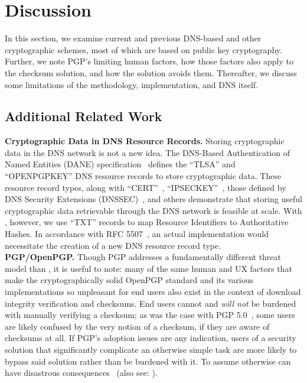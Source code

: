 \section{Discussion} \label{sec:discussion}

In this section, we examine current and previous DNS-based and other
cryptographic schemes, most of which are based on public key cryptography.
Further, we note PGP's limiting human factors, how those factors also apply to
the checksum solution, and how the \SYSTEM{} solution avoids them. Thereafter,
we discuss some limitations of the \SYSTEM{} methodology, implementation, and
DNS itself.

\subsection{Additional Related Work}

\noindent\textbf{Cryptographic Data in DNS Resource Records.} Storing
cryptographic data in the DNS network is not a new idea. The DNS-Based
Authentication of Named Entities (DANE) specification~\cite{DANE1, DANE2, DANE3}
defines the ``TLSA'' and ``OPENPGPKEY'' DNS resource records to store
cryptographic data. These resource record types, along with
``CERT''~\cite{CERT}, ``IPSECKEY''~\cite{IPSECKEY}, those defined by DNS
Security Extensions (DNSSEC)~\cite{DNSSEC}, and others demonstrate that storing
useful cryptographic data retrievable through the DNS network is feasible at
scale. With \SYSTEM{}, however, we use ``TXT'' records to map Resource
Identifiers to Authoritative Hashes. In accordance with RFC 5507~\cite{RFC5507},
an actual \SYSTEM{} implementation would necessitate the creation of a new DNS
resource record type. \\

\noindent\textbf{PGP/OpenPGP.} Though PGP addresses a fundamentally different
threat model than \SYSTEM{}, it is useful to note: many of the same human and UX
factors that make the cryptographically solid OpenPGP standard and its various
implementations so unpleasant for end users also exist in the context of
download integrity verification and checksums. End users cannot and \textit{will
not} be burdened with manually verifying a checksum; as was the case with PGP
5.0~\cite{PGPBad}, some users are likely confused by the very notion of a
checksum, if they are aware of checksums at all. If PGP's adoption issues are
any indication, users of a security solution that significantly complicate an
otherwise simple task are more likely to bypass said solution rather than be
burdened with it. To assume otherwise can have disastrous
consequences~\cite{PGPBad} (also see: ). \\

